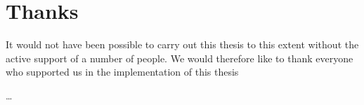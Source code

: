 
\section*{Thanks}
It would not have been possible to carry out this thesis to this extent without the active support of a number of people. We would therefore like to thank everyone who supported us in the implementation of this thesis

\dots
